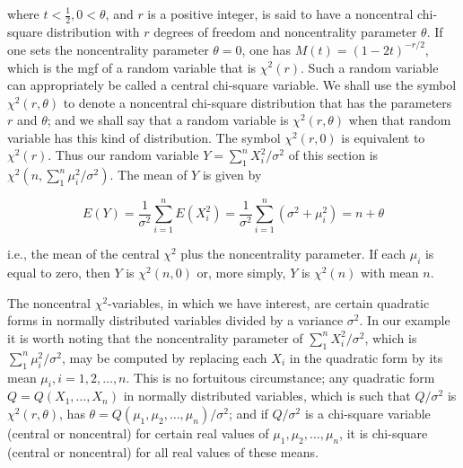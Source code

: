 where $t<\frac{1}{2}, 0<\theta$, and $r$ is a positive integer, is said to have a noncentral chi-square distribution with $r$ degrees of freedom and noncentrality parameter $\theta$. If one sets the noncentrality parameter $\theta=0$, one has $M(t)=(1-2 t)^{-r / 2}$, which is the mgf of a random variable that is $\chi^{2}(r)$. Such a random variable can appropriately be called a central chi-square variable. We shall use the symbol $\chi^{2}(r, \theta)$ to denote a noncentral chi-square distribution that has the parameters $r$ and $\theta$; and we shall say that a random variable is $\chi^{2}(r, \theta)$ when that random variable has this kind of distribution. The symbol $\chi^{2}(r, 0)$ is equivalent to $\chi^{2}(r)$. Thus our random variable $Y=\sum_{1}^{n} X_{i}^{2} / \sigma^{2}$ of this section is $\chi^{2}\left(n, \sum_{1}^{n} \mu_{i}^{2} / \sigma^{2}\right)$. The mean of $Y$ is given by


\begin{equation*}
E(Y)=\frac{1}{\sigma^{2}} \sum_{i=1}^{n} E\left(X_{i}^{2}\right)=\frac{1}{\sigma^{2}} \sum_{i=1}^{n}\left(\sigma^{2}+\mu_{i}^{2}\right)=n+\theta \tag{9.3.3}
\end{equation*}


i.e., the mean of the central $\chi^{2}$ plus the noncentrality parameter. If each $\mu_{i}$ is equal to zero, then $Y$ is $\chi^{2}(n, 0)$ or, more simply, $Y$ is $\chi^{2}(n)$ with mean $n$.

The noncentral $\chi^{2}$-variables, in which we have interest, are certain quadratic forms in normally distributed variables divided by a variance $\sigma^{2}$. In our example it is worth noting that the noncentrality parameter of $\sum_{1}^{n} X_{i}^{2} / \sigma^{2}$, which is\\
$\sum_{1}^{n} \mu_{i}^{2} / \sigma^{2}$, may be computed by replacing each $X_{i}$ in the quadratic form by its mean $\mu_{i}, i=1,2, \ldots, n$. This is no fortuitous circumstance; any quadratic form $Q=Q\left(X_{1}, \ldots, X_{n}\right)$ in normally distributed variables, which is such that $Q / \sigma^{2}$ is $\chi^{2}(r, \theta)$, has $\theta=Q\left(\mu_{1}, \mu_{2}, \ldots, \mu_{n}\right) / \sigma^{2}$; and if $Q / \sigma^{2}$ is a chi-square variable (central or noncentral) for certain real values of $\mu_{1}, \mu_{2}, \ldots, \mu_{n}$, it is chi-square (central or noncentral) for all real values of these means.

